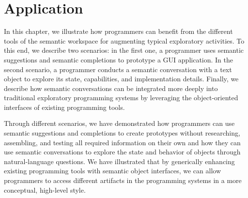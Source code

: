 
\chapter{Application}
\label{cha:application}

In this chapter, we illustrate how programmers can benefit from the different tools of the semantic workspace for augmenting typical exploratory activities.
To this end, we describe two scenarios: in the first one, a programmer uses semantic suggestions and semantic completions to prototype a GUI application.
In the second scenario, a programmer conducts a semantic conversation with a text object to explore its state, capabilities, and implementation details.
Finally, we describe how semantic conversations can be integrated more deeply into traditional exploratory programming systems by leveraging the object-oriented interfaces of existing programming tools.

\pagebreak
{}

\begin{summary}
	Through different scenarios, we have demonstrated how programmers can use semantic suggestions and completions to create prototypes without researching, assembling, and testing all required information on their own and how they can use semantic conversations to explore the state and behavior of objects through natural-language questions.
	We have illustrated that by generically enhancing existing programming tools with semantic object interfaces, we can allow programmers to access different artifacts in the programming systems in a more conceptual, high-level style.
\end{summary}
